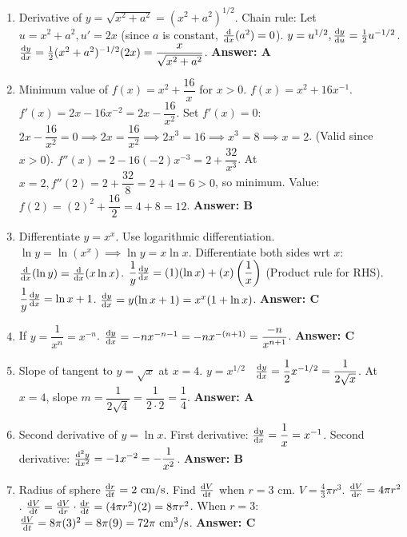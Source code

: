 \begin{enumerate}[label={\arabic*.}]
  \item Derivative of \(y = \sqrt{x^2+a^2} = (x^2+a^2)^{1/2}\).
    Chain rule: Let \(u=x^2+a^2, u'=2x\) (since \(a\) is constant, \(\frac{\mathrm{d}}{\mathrm{d}x}(a^2)=0\)).
    \(y=u^{1/2}, \frac{\mathrm{d}y}{\mathrm{d}u}=\frac{1}{2}u^{-1/2}\).
    \(\frac{\mathrm{d}y}{\mathrm{d}x} = \frac{1}{2}(x^2+a^2)^{-1/2}(2x) = \dfrac{x}{\sqrt{x^2+a^2}}\).
    \textbf{Answer: A}

  \item Minimum value of \(f(x) = x^2 + \dfrac{16}{x}\) for \(x>0\).
    \(f(x) = x^2 + 16x^{-1}\).
    \(f'(x) = 2x - 16x^{-2} = 2x - \dfrac{16}{x^2}\).
    Set \(f'(x)=0\): \(2x - \dfrac{16}{x^2} = 0 \implies 2x = \dfrac{16}{x^2} \implies 2x^3 = 16 \implies x^3=8 \implies x=2\). (Valid since \(x>0\)).
    \(f''(x) = 2 - 16(-2)x^{-3} = 2 + \dfrac{32}{x^3}\).
    At \(x=2, f''(2) = 2 + \dfrac{32}{8} = 2+4=6 > 0\), so minimum.
    Value: \(f(2) = (2)^2 + \dfrac{16}{2} = 4 + 8 = 12\).
    \textbf{Answer: B}

  \item Differentiate \(y = x^x\). Use logarithmic differentiation.
    \(\ln y = \ln(x^x) \implies \ln y = x \ln x\).
    Differentiate both sides wrt \(x\):
    \(\frac{\mathrm{d}}{\mathrm{d}x}(\ln y) = \frac{\mathrm{d}}{\mathrm{d}x}(x \ln x)\).
    \(\dfrac{1}{y}\frac{\mathrm{d}y}{\mathrm{d}x} = (1)(\ln x) + (x)\left(\dfrac{1}{x}\right)\) (Product rule for RHS).
    \(\dfrac{1}{y}\frac{\mathrm{d}y}{\mathrm{d}x} = \ln x + 1\).
    \(\frac{\mathrm{d}y}{\mathrm{d}x} = y(\ln x + 1) = x^x(1 + \ln x)\).
    \textbf{Answer: C}

  \item If \(y = \dfrac{1}{x^n} = x^{-n}\).
    \(\frac{\mathrm{d}y}{\mathrm{d}x} = -n x^{-n-1} = -n x^{-(n+1)} = \dfrac{-n}{x^{n+1}}\).
    \textbf{Answer: C}

  \item Slope of tangent to \(y = \sqrt{x}\) at \(x=4\).
    \(y = x^{1/2}\) \ \(\frac{\mathrm{d}y}{\mathrm{d}x} = \dfrac{1}{2}x^{-1/2} = \dfrac{1}{2\sqrt{x}}\).
    At \(x=4\), slope \(m = \dfrac{1}{2\sqrt{4}} = \dfrac{1}{2 \cdot 2} = \dfrac{1}{4}\).
    \textbf{Answer: A}

  \item Second derivative of \(y = \ln x\).
    First derivative: \(\frac{\mathrm{d}y}{\mathrm{d}x} = \dfrac{1}{x} = x^{-1}\).
    Second derivative: \(\frac{\mathrm{d}^2 y}{\mathrm{d} x^2} = -1x^{-2} = -\dfrac{1}{x^2}\).
    \textbf{Answer: B}

  \item Radius of sphere \(\frac{\mathrm{d}r}{\mathrm{d}t} = 2 \text{ cm/s}\). Find \(\frac{\mathrm{d}V}{\mathrm{d}t}\) when \(r=3 \text{ cm}\). \(V=\frac{4}{3}\pi r^3\).
    \(\frac{\mathrm{d}V}{\mathrm{d}r} = 4\pi r^2\).
    \(\frac{\mathrm{d}V}{\mathrm{d}t} = \frac{\mathrm{d}V}{\mathrm{d}r} \cdot \frac{\mathrm{d}r}{\mathrm{d}t} = (4\pi r^2)(2) = 8\pi r^2\).
    When \(r=3\): \(\frac{\mathrm{d}V}{\mathrm{d}t} = 8\pi (3)^2 = 8\pi(9) = 72\pi \text{ cm}^3/\text{s}\).
    \textbf{Answer: C}


\end{enumerate}
